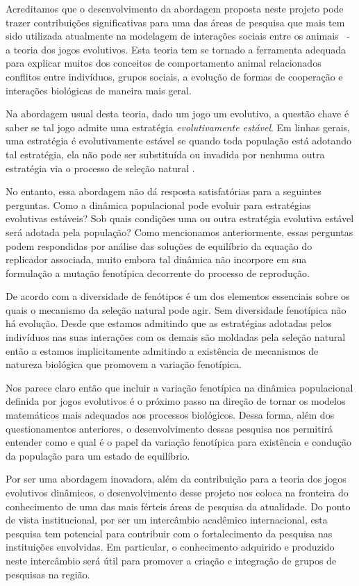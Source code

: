\documentclass[
	12pt,				%
	openany,			%
	oneoside,			%
	a4paper,			%
	english,			%
	spanish,			%
	brazil,				%
	]{abntex2}
\begin{document}
Acreditamos que o desenvolvimento da abordagem proposta neste projeto pode trazer contribuições significativas para uma das áreas de pesquisa que mais tem sido utilizada atualmente na modelagem de interações sociais entre os animais ~-~ a teoria dos jogos evolutivos. Esta teoria tem se tornado a ferramenta adequada para explicar muitos dos conceitos de comportamento animal relacionados conflitos entre indivíduos, grupos sociais, a evolução de formas de cooperação e interações biológicas de maneira mais geral.    

Na abordagem usual desta teoria, dado um jogo um evolutivo, a questão chave é saber se tal jogo admite uma estratégia \textit{evolutivamente estável}. Em linhas gerais, uma estratégia é evolutivamente estável se quando toda população está adotando tal estratégia, ela não pode ser substituída ou invadida por nenhuma outra estratégia via o processo de seleção natural \cite{MAYBOOK}.

No entanto, essa abordagem não dá resposta satisfatórias para a seguintes perguntas. Como a dinâmica populacional pode evoluir para estratégias evolutivas estáveis? Sob quais condições uma ou outra estratégia evolutiva estável será adotada pela população? Como mencionamos anteriormente, essas perguntas podem respondidas por análise das soluções de equilíbrio da equação do replicador associada, muito embora tal dinâmica não incorpore em sua formulação a mutação fenotípica decorrente do processo de reprodução.
      
De acordo com \cite{NOVBOOK} a diversidade de fenótipos é um dos elementos essenciais sobre os quais o mecanismo da seleção natural pode agir. Sem diversidade fenotípica não há evolução.  Desde que estamos admitindo  que as estratégias adotadas pelos indivíduos nas suas interações com os demais são moldadas pela seleção natural então a estamos implicitamente admitindo a existência de mecanismos de natureza biológica que promovem a variação fenotípica.  

Nos parece claro então que incluir a variação fenotípica na dinâmica populacional definida por jogos evolutivos é  o próximo passo na direção de tornar os modelos matemáticos mais adequados aos processos biológicos.  Dessa forma, além dos questionamentos anteriores, o desenvolvimento dessas pesquisa nos permitirá entender como e qual é o papel da variação fenotípica para existência e condução da população para um estado de equilíbrio. 

Por ser uma abordagem inovadora, além da contribuição para a teoria dos jogos evolutivos dinâmicos, o desenvolvimento  desse projeto nos coloca na fronteira do conhecimento de uma das mais férteis áreas de pesquisa da atualidade. Do ponto de vista institucional, por ser um intercâmbio acadêmico internacional, esta pesquisa tem potencial para contribuir com o fortalecimento da pesquisa nas instituições envolvidas. Em particular, o conhecimento adquirido e produzido neste intercâmbio será útil para promover a criação e integração de grupos de pesquisas na região.   
\end{document}
